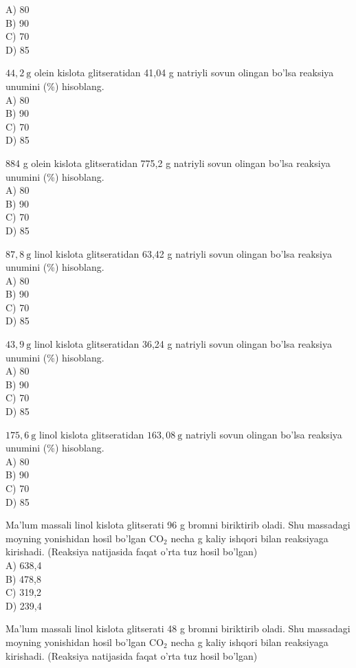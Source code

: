 A) 80\\
B) 90\\
C) 70\\
D) 85
  \item $44,2 \mathrm{~g}$ olein kislota glitseratidan 41,04 g natriyli sovun olingan bo'lsa reaksiya unumini (\%) hisoblang.\\
A) 80\\
B) 90\\
C) 70\\
D) 85
  \item 884 g olein kislota glitseratidan 775,2 g natriyli sovun olingan bo'lsa reaksiya unumini (\%) hisoblang.\\
A) 80\\
B) 90\\
C) 70\\
D) 85
  \item $87,8 \mathrm{~g}$ linol kislota glitseratidan 63,42 g natriyli sovun olingan bo'lsa reaksiya unumini (\%) hisoblang.\\
A) 80\\
B) 90\\
C) 70\\
D) 85
  \item $43,9 \mathrm{~g}$ linol kislota glitseratidan 36,24 g natriyli sovun olingan bo'lsa reaksiya unumini (\%) hisoblang.\\
A) 80\\
B) 90\\
C) 70\\
D) 85
  \item $175,6 \mathrm{~g}$ linol kislota glitseratidan $163,08 \mathrm{~g}$ natriyli sovun olingan bo'lsa reaksiya unumini (\%) hisoblang.\\
A) 80\\
B) 90\\
C) 70\\
D) 85
  \item Ma'lum massali linol kislota glitserati 96 g bromni biriktirib oladi. Shu massadagi moyning yonishidan hosil bo'lgan $\mathrm{CO}_{2}$ necha g kaliy ishqori bilan reaksiyaga kirishadi. (Reaksiya natijasida faqat o'rta tuz hosil bo'lgan)\\
A) 638,4\\
B) 478,8\\
C) 319,2\\
D) 239,4
  \item Ma'lum massali linol kislota glitserati 48 g bromni biriktirib oladi. Shu massadagi moyning yonishidan hosil bo'lgan $\mathrm{CO}_{2}$ necha g kaliy ishqori bilan reaksiyaga kirishadi. (Reaksiya natijasida faqat o'rta tuz hosil bo'lgan)\\
